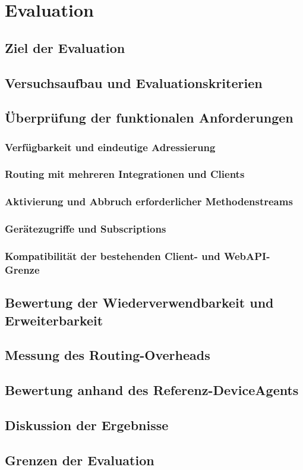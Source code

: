 \chapter{Evaluation}\label{ch:evaluation}
\section{Ziel der Evaluation}
\section{Versuchsaufbau und Evaluationskriterien}

\section{Überprüfung der funktionalen Anforderungen}
\subsection{Verfügbarkeit und eindeutige Adressierung}
\subsection{Routing mit mehreren Integrationen und Clients}
\subsection{Aktivierung und Abbruch erforderlicher Methodenstreams}
\subsection{Gerätezugriffe und Subscriptions}
\subsection{Kompatibilität der bestehenden Client- und WebAPI-Grenze}

\pagebreak[0]
\section{Bewertung der Wiederverwendbarkeit und Erweiterbarkeit}
\section{Messung des Routing-Overheads}
\section{Bewertung anhand des Referenz-DeviceAgents}
\section{Diskussion der Ergebnisse}
\section{Grenzen der Evaluation}
